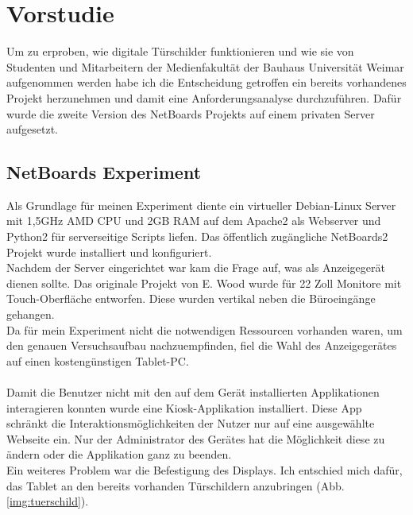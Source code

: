\chapter{Vorstudie}\label{Vorstudie}
Um zu erproben, wie digitale Türschilder funktionieren und wie sie von Studenten und Mitarbeitern der Medienfakultät der Bauhaus Universität Weimar aufgenommen werden habe ich die Entscheidung getroffen ein bereits vorhandenes Projekt herzunehmen und damit eine Anforderungsanalyse durchzuführen.
Dafür wurde die zweite Version des NetBoards Projekts\cite{netboards:website} auf einem privaten Server aufgesetzt.
\section{NetBoards Experiment}\label{NetBoards Experiment}
Als Grundlage für meinen Experiment diente ein virtueller Debian-Linux Server mit 1,5GHz AMD CPU und 2GB RAM auf dem Apache2 als Webserver und Python2 für serverseitige Scripts liefen. Das öffentlich zugängliche NetBoards2 Projekt wurde installiert und konfiguriert.\\
Nachdem der Server eingerichtet war kam die Frage auf, was als Anzeigegerät dienen sollte. Das originale Projekt von E. Wood wurde für 22 Zoll Monitore mit Touch-Oberfläche entworfen. Diese wurden vertikal neben die Büroeingänge gehangen.\\
Da für mein Experiment nicht die notwendigen Ressourcen vorhanden waren, um den genauen Versuchsaufbau nachzuempfinden, fiel die Wahl des Anzeigegerätes auf einen kostengünstigen Tablet-PC.
\\
\\
Damit die Benutzer nicht mit den auf dem Gerät installierten Applikationen interagieren konnten wurde eine Kiosk-Applikation installiert.
Diese App schränkt die Interaktionsmöglichkeiten der Nutzer nur auf eine ausgewählte Webseite ein. Nur der Administrator des Gerätes hat die Möglichkeit diese zu ändern oder die Applikation ganz zu beenden.\\
Ein weiteres Problem war die Befestigung des Displays.
Ich entschied mich dafür, das Tablet an den bereits vorhanden Türschildern anzubringen (Abb. \ref{img:tuerschild}).
